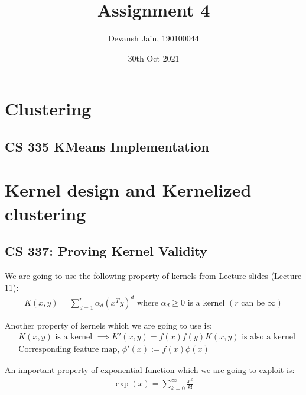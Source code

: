 \documentclass[12pt, fleqn]{article}
\title{Assignment 4}
\author{Devansh Jain, 190100044}
\date{30th Oct 2021}
\begin{document}
\maketitle
\tableofcontents
\thispagestyle{empty}
\setcounter{page}{0}

\newpage
\section{Clustering}
\subsection{CS 335 KMeans Implementation}



\newpage
\section{Kernel design and Kernelized clustering}
\subsection{CS 337: Proving Kernel Validity}
We are going to use the following property of kernels from Lecture slides (Lecture 11):
\begin{equation*}
    \begin{aligned}
        K(x,y) = \sum_{d=1}^r \alpha_d(x^T y)^d \text{ where } \alpha_d \ge 0 \text{ is a kernel } (r \text{ can be } \infty)
    \end{aligned}
\end{equation*}

Another property of kernels which we are going to use is:
\begin{equation*}
    \begin{aligned}
         & K(x, y) \text{ is a kernel } \implies K'(x, y) = f(x) f(y) K(x, y) \text{ is also a kernel} \\
         & \text{Corresponding feature map, } \phi'(x) := f(x) \phi(x)
    \end{aligned}
\end{equation*}


An important property of exponential function which we are going to exploit is:
\begin{equation*}
    \begin{aligned}
        \exp(x) = \sum_{k=0}^{\infty} \frac{x^k}{k!}
    \end{aligned}
\end{equation*}
\end{document}

